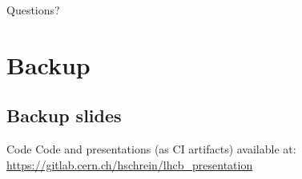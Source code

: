 \documentclass[aspectratio=169, smaller]{beamer}
\begin{document}
\begin{frame}{Questions?}
\end{frame}


\backupbegin
\section{Backup}

\subsection{Backup slides}

\begin{frame}{Code}
	Code and presentations (as CI artifacts) available at: \url{https://gitlab.cern.ch/hschrein/lhcb_presentation}
\end{frame}

\backupend
\end{document}
